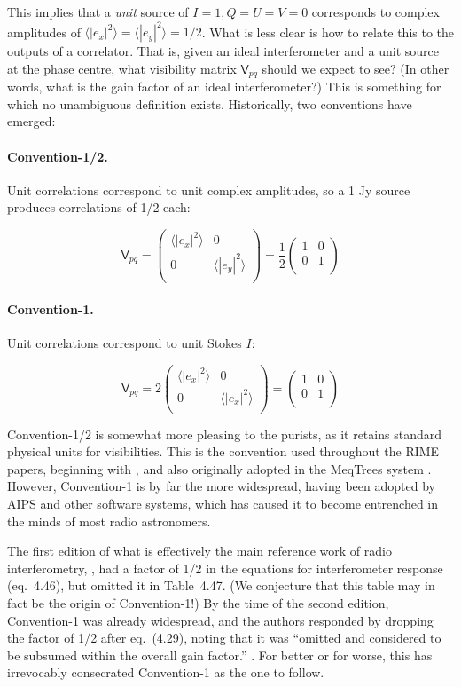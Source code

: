 \documentclass[]{aa}
\newcommand{\matrixtt}[4]{\left( \begin{array}{cc}#1&#2\\#3&#4\\\end{array} \right)}
\newcommand{\coh}[2]{\mathsf{{#1}}_{{#2}}}
\begin{document}
This implies that a {\em unit} source of $I=1, Q=U=V=0$ corresponds to complex amplitudes of $\langle |e_x|^2\rangle =\langle |e_y|^2\rangle = 1/2$. What is less clear is how to relate this to the outputs of a correlator. That is, given an ideal interferometer and a unit source at the phase centre, what visibility matrix $\coh{V}{pq}$ should we expect to see? (In other words, what is the gain factor of an ideal interferometer?) This is something for which no unambiguous definition exists. Historically, two conventions have emerged:

\paragraph{Convention-1/2.} Unit correlations correspond to unit complex amplitudes, so a 1 Jy source produces correlations of 1/2 each: 

\[
\coh{V}{pq} = \matrixtt{\langle |e_x|^2\rangle }{0}{0}{\langle |e_y|^2\rangle } = \frac{1}{2}\matrixtt{1}{0}{0}{1}
\]

\paragraph{Convention-1.} Unit correlations correspond to unit Stokes $I$:

\[
\coh{V}{pq} = 2\matrixtt{\langle |e_x|^2\rangle }{0}{0}{\langle |e_x|^2\rangle } = \matrixtt{1}{0}{0}{1}
\]

Convention-1/2 is somewhat more pleasing to the purists, as it retains standard physical units for visibilities. This is the convention used throughout the RIME papers, beginning with \citet{ME1}, and also originally adopted in the MeqTrees system \citep{meqtrees}. However, Convention-1 is by far the more widespread, having been adopted by AIPS and other software systems, which has caused it to become entrenched in the minds of most radio astronomers.

The first edition of what is effectively the main reference work of radio interferometry, \citet*{tms1}, had a factor of 1/2 in the equations for interferometer response (eq.~4.46), but omitted it in Table~4.47. (We conjecture that this table may in fact be the origin of Convention-1!) By the time of the second edition, Convention-1 was already widespread, and the authors responded by dropping the factor of 1/2 after eq.~(4.29), noting that it was ``omitted and considered to be subsumed within the overall gain factor.'' \citep[see p. 102]{tms}. For better or for worse, this has irrevocably consecrated Convention-1 as the one to follow.
\end{document}
